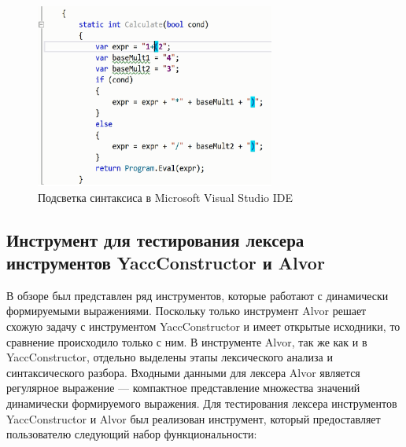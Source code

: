 \documentclass{matmex-diploma}
\begin{document}
\begin{enumerate}
\begin{figure}[h!]
\begin{center}
\includegraphics[width=0.7\textwidth]{screen}
\caption{Подсветка синтаксиса в Microsoft Visual Studio IDE}
\label{fig:screen} 
\end{center}
\end{figure}

\newpage
\subsection {Инструмент для тестирования лексера инструментов YaccConstructor и Alvor}

В обзоре был представлен ряд инструментов, которые работают с динамически формируемыми выражениями. Поскольку только инструмент Alvor решает схожую 
задачу с инструментом YaccConstructor и имеет открытые исходники, то сравнение происходило только с ним.  В инструменте Alvor, так же как и в YaccConstructor, 
отдельно выделены этапы лексического анализа и синтаксического разбора. Входными данными для лексера Alvor является регулярное выражение --- компактное представление 
множества значений динамически формируемого выражения. Для тестирования лексера инструментов YaccConstructor и Alvor был реализован инструмент, который предоставляет 
пользователю следующий набор функциональности:


\end{enumerate}
\end{document}

